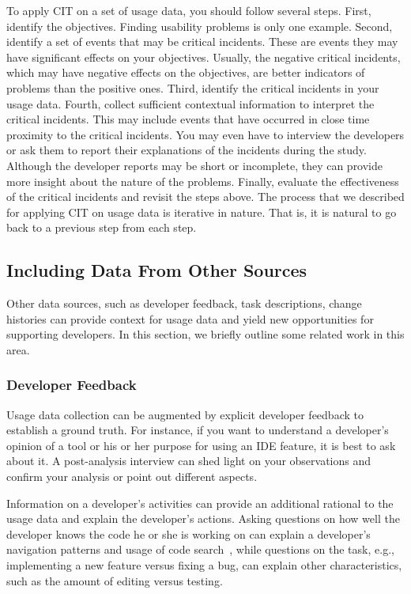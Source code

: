 To apply CIT on a set of usage data, you should follow several steps. First,
identify the objectives. Finding usability problems is only one example.
Second, identify a set of events that may be critical incidents. These are
events they may have significant effects on your objectives. Usually, the
negative critical incidents, which may have negative effects on the objectives,
are better indicators of problems than the positive ones. Third, identify the
critical incidents in your usage data. Fourth, collect sufficient contextual
information to interpret the critical incidents. This may include events that
have occurred in close time proximity to the critical incidents. You may even
have to interview the developers or ask them to report their explanations of the
incidents during the study. Although the developer reports may be short or
incomplete, they can provide more insight about the nature of the problems.
Finally, evaluate the effectiveness of the critical incidents and revisit the
steps above. The process that we described for applying CIT on usage data is
iterative in nature. That is, it is natural to go back to a previous step from
each step.

\label{sec:IncludingOtherSources}
\subsection{Including Data From Other Sources}


Other data sources, such as developer feedback, task descriptions, change histories can provide context for usage data and yield new opportunities for supporting developers. In this section, we briefly outline some related work in this area.

\subsubsection{Developer Feedback}

Usage data collection can be augmented by explicit developer feedback to establish a ground truth. For instance, if you want to understand a developer's opinion of a tool or his or her purpose for using an IDE feature, it is best to ask about it. A post-analysis interview can shed light on your observations and confirm your analysis or point out different aspects.

Information on a developer's activities can provide an additional rational to the usage data and explain the developer's actions. Asking questions on how well the developer knows the code he or she is working on can explain a developer's navigation patterns and usage of code search~, while questions on the task, e.g., implementing a new feature versus fixing a bug, can explain other characteristics, such as the amount of editing versus testing.

